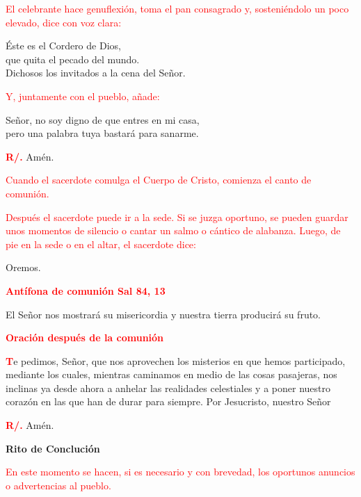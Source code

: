 \documentclass[12pt, letterpaper]{report}
\begin{document}
\large{\textcolor{red}{El celebrante hace genuflexi\'on, toma el pan consagrado y, sosteni\'endolo un poco elevado, dice con voz clara:}}

\noindent
\Large \'Este es el Cordero de Dios,\\ 
que quita el pecado del mundo.\\ 
Dichosos los invitados a la cena del Se\~nor.

\large{\textcolor{red}{Y, juntamente con el pueblo, a\~nade:}}

\noindent
\Large Se\~nor, no soy digno de que entres en mi casa,\\ 
pero una palabra tuya bastar\'a para sanarme.

\noindent
\Large {\bfseries \textcolor{red}{R/.}} \hspace{0.5cm} Am\'en.

\large{\textcolor{red}{Cuando el sacerdote comulga el Cuerpo de Cristo, comienza el canto de comuni\'on.}}

\large{\textcolor{red}{Despu\'es el sacerdote puede ir a la sede. Si se juzga oportuno, se pueden guardar unos momentos de silencio o cantar un salmo o c\'antico de alabanza. Luego, de pie en la sede o en el altar, el sacerdote dice:}}

\Large Oremos.

\large {\bfseries \textcolor{red}{Ant\'ifona de comuni\'on \hspace{1cm} Sal 84, 13}}

\Large El Se\~nor nos mostrar\'a su misericordia y nuestra tierra producir\'a su fruto.

\large {\bfseries \textcolor{red}{Oraci\'on despu\'es de la comuni\'on}}

\lettrine[lines=1]{\bfseries \textcolor{red}{T}}{}\Large e pedimos, Se\~nor, que nos aprovechen los misterios en que hemos participado, mediante los cuales, mientras caminamos en medio de las cosas pasajeras, nos inclinas ya desde ahora a anhelar las realidades celestiales y a poner nuestro coraz\'on en las que han de durar para
siempre. Por Jesucristo, nuestro Se\~nor

\noindent
\Large {\bfseries \textcolor{red}{R/.}} \hspace{0.5cm} Am\'en.

\newpage

\begin{center}
\Huge {\bfseries Rito de Concluci\'on}
\end{center}

\large{\textcolor{red}{En este momento se hacen, si es necesario y con brevedad, los oportunos anuncios o advertencias al pueblo.}}
\end{document}
